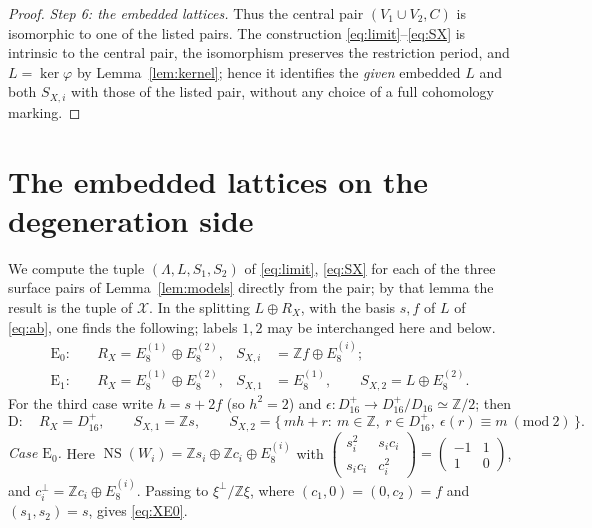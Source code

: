 \documentclass[11pt]{article}
\newcommand{\Z}{\mathbb Z}
\newcommand{\NS}{\operatorname{NS}}
\newcommand{\calX}{\mathcal X}
\theoremstyle{definition}
\theoremstyle{remark}
\begin{document}
\begin{proof}
\emph{Step 6: the embedded lattices.}
Thus the central pair \((V_1\cup V_2,C)\) is isomorphic to one of the
listed pairs. The construction \eqref{eq:limit}--\eqref{eq:SX} is
intrinsic to the central pair, the isomorphism preserves the
restriction period, and \(L=\ker\varphi\) by Lemma~\ref{lem:kernel};
hence it identifies the \emph{given} embedded \(L\) and both
\(S_{X,i}\) with those of the listed pair, without any choice of a full
cohomology marking.
\end{proof}

\section{The embedded lattices on the degeneration side}\label{sec:latticesX}

We compute the tuple \((\Lambda,L,S_1,S_2)\) of \eqref{eq:limit},
\eqref{eq:SX} for each of the three surface pairs of
Lemma~\ref{lem:models} directly from the pair; by that lemma the
result is the tuple of \(\calX\). In the splitting \(L\oplus R_X\),
with the basis \(s,f\) of \(L\) of \eqref{eq:ab}, one finds the
following; labels \(1,2\) may be interchanged here and below.
\begin{align}
 \mathrm E_0:\quad&
 R_X=E_8^{(1)}\oplus E_8^{(2)},&
 S_{X,i}&=\Z f\oplus E_8^{(i)};                \label{eq:XE0}\\
 \mathrm E_1:\quad&
 R_X=E_8^{(1)}\oplus E_8^{(2)},&
 S_{X,1}&=E_8^{(1)},\qquad
 S_{X,2}=L\oplus E_8^{(2)}.                    \label{eq:XE1}
\end{align}
For the third case write \(h=s+2f\) (so \(h^2=2\)) and
\(\epsilon\colon D_{16}^{+}\to D_{16}^{+}/D_{16}\simeq\Z/2\); then
\begin{equation}\label{eq:XD}
 \mathrm D:\quad R_X=D_{16}^{+},\qquad S_{X,1}=\Z s,\qquad
 S_{X,2}=\{\,mh+r:\ m\in\Z,\ r\in D_{16}^{+},\
                   \epsilon(r)\equiv m\ (\mathrm{mod}\ 2)\,\}.
\end{equation}
\emph{Case \(\mathrm E_0\).} Here
\(\NS(W_i)=\Z s_i\oplus\Z c_i\oplus E_8^{(i)}\) with
\(\left(\begin{smallmatrix}s_i^2&s_ic_i\\s_ic_i&c_i^2\end{smallmatrix}\right)
=\left(\begin{smallmatrix}-1&1\\1&0\end{smallmatrix}\right)\), and
\(c_i^\perp=\Z c_i\oplus E_8^{(i)}\). Passing to \(\xi^\perp/\Z\xi\),
where \((c_1,0)=(0,c_2)=f\) and \((s_1,s_2)=s\), gives \eqref{eq:XE0}.
\end{document}
